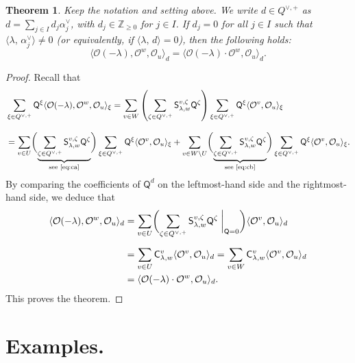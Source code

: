 \documentclass[11pt,a4paper,reqno,dvipdfmx]{amsart}
\numberwithin{equation}{section}
\newcommand{\BZ}{\mathbb{Z}}
\newcommand{\CO}{\mathcal{O}}
\newcommand{\sQ}{\mathsf{Q}}
\newcommand{\sS}{\mathsf{S}}
\newcommand{\sC}{\mathsf{C}}
\newcommand{\pair}[2]{\langle #1,\,#2 \rangle}
\newcommand{\twp}[2]{ \langle \CO^{#1}, \CO_{#2} \rangle }
\theoremstyle{plain}
\newtheorem{thm}[lem]{Theorem}
\theoremstyle{definition}
\theoremstyle{remark}
\begin{document}
%
%
\begin{thm} \label{thm:3pt-lam2}
Keep the notation and setting above. We write $d \in Q^{\vee,+}$ as 
$d = \sum_{j \in I} d_{j}\alpha_{j}^{\vee}$, with $d_{j} \in \BZ_{\ge 0}$ for $j \in I$. 
If $d_{j}=0$ for all $j \in I$ such that $\pair{\lambda}{\alpha_{j}^{\vee}} \ne 0$ 
{\rm (}or equivalently, if $\pair{\lambda}{d}=0${\rm )}, then the following holds{\rm :} 
%
\begin{equation}
\langle \CO(- \lambda),\CO^{w},\CO_{u} \rangle_{d} = 
\langle \CO(- \lambda) \cdot \CO^{w},\CO_{u} \rangle_{d}. 
\end{equation}
%
\end{thm}

\begin{proof}
Recall that 
%
\begin{align*}
& \sum_{\xi \in Q^{\vee,+}}
\sQ^{\xi} \langle \CO(- \lambda),\CO^{w},\CO_{u} \rangle_{\xi} 
= \sum_{v \in W} \left( \sum_{\zeta \in Q^{\vee,+}}\sS_{\lambda,w}^{v,\zeta} \sQ^{\zeta} \right)
\sum_{\xi \in Q^{\vee,+}} \sQ^{\xi} \twp{v}{u}_{\xi} \\[3mm]
%
& 
= \sum_{v \in U} \biggl( 
\underbrace{ \sum_{\zeta \in Q^{\vee,+}}
\sS_{\lambda,w}^{v,\zeta} \sQ^{\zeta}}_{ \text{see \eqref{eq:ca}} } \biggr)
\sum_{\xi \in Q^{\vee,+}} \sQ^{\xi} \twp{v}{u}_{\xi} + 
%
\sum_{v \in W \setminus U} \biggl( 
\underbrace{ \sum_{\zeta \in Q^{\vee,+}}
\sS_{\lambda,w}^{v,\zeta} \sQ^{\zeta}}_{ \text{see \eqref{eq:cb}} } \biggr)
\sum_{\xi \in Q^{\vee,+}} \sQ^{\xi} \twp{v}{u}_{\xi}. 
\end{align*}
%
By comparing the coefficients of $\sQ^{d}$ 
on the leftmost-hand side and the rightmost-hand side, we deduce that 
%
\begin{align*}
\langle \CO(- \lambda),\CO^{w},\CO_{u} \rangle_{d}
& = \sum_{v \in U} \biggl( \sum_{\zeta \in Q^{\vee,+}} 
\sS_{\lambda,w}^{v,\zeta} \sQ^{\zeta} \biggm|_{\sQ=0} \biggr)
\twp{v}{u}_{d} \\[2mm]
& = \sum_{v \in U} \sC_{\lambda,w}^{v} \twp{v}{u}_{d}
  = \sum_{v \in W} \sC_{\lambda,w}^{v} \twp{v}{u}_{d} \\
& = \langle \CO(- \lambda) \cdot \CO^{w},\CO_{u} \rangle_{d}. 
\end{align*}
%
This proves the theorem. 
\end{proof}

\appendix

\section{Examples.}
\label{sec:example}
\end{document}
